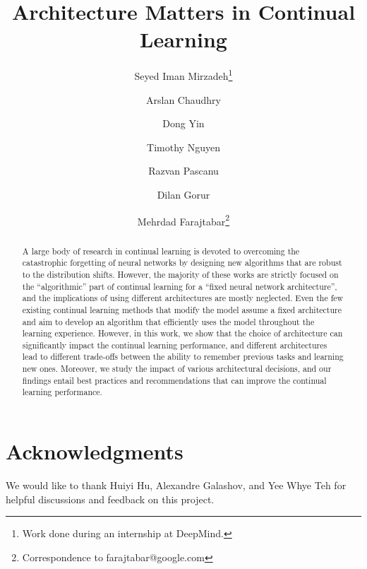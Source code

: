 \documentclass{article}
\title{Architecture Matters in Continual Learning}
\author[1]{Seyed Iman Mirzadeh\footnote{Work done during an internship at DeepMind.}}
\author[2]{Arslan Chaudhry}
\author[2]{Dong Yin}
\author[2]{\authorcr Timothy Nguyen}
\author[2]{Razvan Pascanu}
\author[2]{Dilan Gorur}
\author[2]{Mehrdad Farajtabar\footnote{Correspondence to farajtabar@google.com}}
\affil[1]{Washington State University}
\affil[2]{DeepMind}
\date{}
\begin{document}
\vspace{-1mm}
\maketitle

\vspace{-2mm}
\begin{abstract}

A large body of research in continual learning is devoted to overcoming the catastrophic forgetting of neural networks by designing new algorithms that are robust to the distribution shifts. However, the majority of these works are strictly focused on the ``algorithmic'' part of continual learning for a ``fixed neural network architecture'', and the implications of using different architectures are mostly neglected. Even the few existing continual learning methods that modify the model assume a fixed architecture and aim to develop an algorithm that efficiently uses the model throughout the learning experience. However, in this work, we show that the choice of architecture can significantly impact the continual learning performance, and different architectures lead to different trade-offs between the ability to remember previous tasks and learning new ones. Moreover, we study the impact of various architectural decisions, and our findings entail best practices and recommendations that can improve the continual learning performance.
\end{abstract}







\section*{Acknowledgments}
We would like to thank Huiyi Hu, Alexandre Galashov, and Yee Whye Teh for helpful discussions and feedback on this project. 





\end{document}
